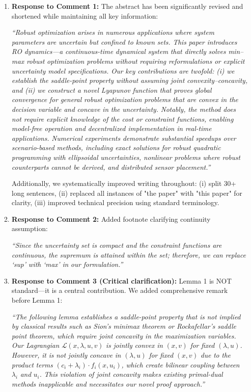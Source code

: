 \documentclass[journal,twoside,web]{ieeecolor}
\begin{document}
\begin{enumerate}
\item \textbf{Response to Comment 1:} The abstract has been significantly revised and shortened while maintaining all key information:

{\color{revisionblue}\textit{``Robust optimization arises in numerous applications where system parameters are uncertain but confined to known sets. This paper introduces RO dynamics—a continuous-time dynamical system that directly solves min–max robust optimization problems without requiring reformulations or explicit uncertainty model specifications. Our key contributions are twofold: (i) we establish the saddle-point property without assuming joint convexity–concavity, and (ii) we construct a novel Lyapunov function that proves global convergence for general robust optimization problems that are convex in the decision variable and concave in the uncertainty. Notably, the method does not require explicit knowledge of the cost or constraint functions, enabling model-free operation and decentralized implementation in real-time applications. Numerical experiments demonstrate substantial speedups over scenario-based methods, including exact solutions for robust quadratic programming with ellipsoidal uncertainties, nonlinear problems where robust counterparts cannot be derived, and distributed sensor placement.''}}

Additionally, we systematically improved writing throughout: (i) split 30+ long sentences, (ii) replaced all instances of "the paper" with "this paper" for clarity, (iii) improved technical precision using standard terminology.

\item \textbf{Response to Comment 2:} Added footnote clarifying continuity assumption:

{\color{revisionblue}\textit{``Since the uncertainty set is compact and the constraint functions are continuous, the supremum is attained within the set; therefore, we can replace `sup' with `max' in our formulation.''}}

\item \textbf{Response to Comment 3 (Critical clarification):} Lemma 1 is NOT standard—it is a central contribution. We added comprehensive remark before Lemma 1:

{\color{revisionblue}\textit{``The following lemma establishes a saddle-point property that is not implied by classical results such as Sion's minimax theorem or Rockafellar's saddle point theorem, which require joint concavity in the maximization variables. Our Lagrangian $\mathcal{L}(x,\lambda,u,v)$ is jointly convex in $(x,v)$ for fixed $(\lambda,u)$. However, it is not jointly concave in $(\lambda,u)$ for fixed $(x,v)$ due to the product terms $(c_i+\lambda_i) \cdot f_i(x,u_i)$, which create bilinear coupling between $\lambda_i$ and $u_i$. This violation of joint concavity makes existing primal-dual methods inapplicable and necessitates our novel proof approach.''}}


\end{enumerate}
\end{document}
